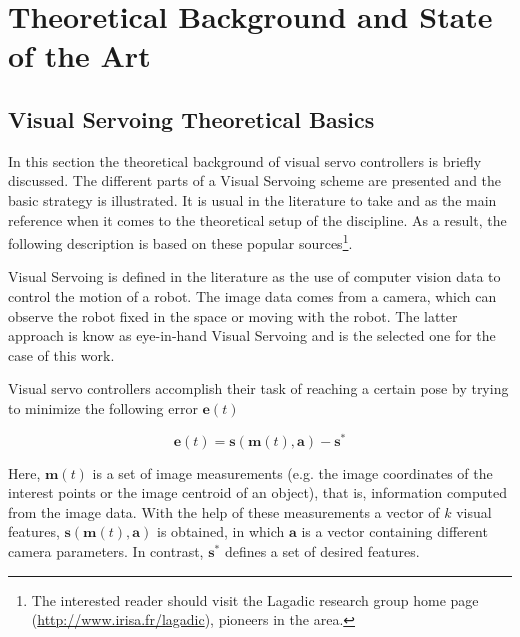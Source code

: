 
\chapter{Theoretical Background and State of the Art}
\label{chap:theory-state-art}



\section{Visual Servoing Theoretical Basics}
\label{sec:vs-theory}

In this section the theoretical background of visual servo controllers is briefly discussed. The different parts of a Visual Servoing scheme are presented and the basic strategy is illustrated. It is usual in the literature to take \cite{chaumette_visual_2006} and \cite{chaumette_visual_2007} as the main reference when it comes to the theoretical setup of the discipline. As a result, the following description is based on these popular sources\footnote{The interested reader should visit the Lagadic research group home page (\url{http://www.irisa.fr/lagadic}), pioneers in the area.}.

Visual Servoing is defined in the literature as the use of computer vision data to control the motion of a robot. The image data comes from a camera, which can observe the robot fixed in the space or moving with the robot. The latter approach is know as eye-in-hand Visual Servoing and is the selected one for the case of this work.


Visual servo controllers accomplish their task of reaching a certain pose by trying to minimize the following error $\bm{e}(t)$

\begin{equation}
\bm{e}(t) = \bm{s}(\bm{m}(t), \bm{a}) - \bm{s}^\ast
\label{eq:vs-th-1}
\end{equation}

Here, $\bm{m}(t)$ is a set of image measurements (e.g. the image coordinates of the interest points or the image centroid of an object), that is, information computed from the image data. With the help of these measurements a vector of $k$ visual features, $\bm{s}(\bm{m}(t), \bm{a})$ is obtained, in which $\bm{a}$ is a vector containing different camera parameters. In contrast, $\bm{s}^\ast$ defines a set of desired features.

